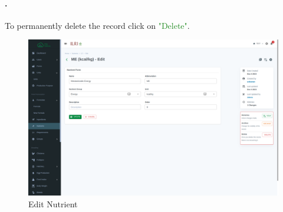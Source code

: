 \paragraph{.}To permanently delete the record click on \textcolor{ForestGreen}{"Delete"}.

\begin{figure}[h!]
  	\includegraphics[width=15cm]{screenshots/nutrient_edit_page.png}
  	\caption{Edit Nutrient }
  	\label{fig:nutrient_edit_page}
\end{figure}